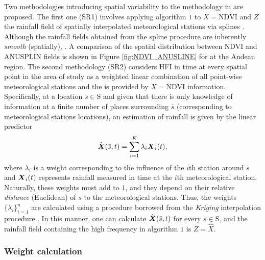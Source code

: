 {{Two methodologies introducing spatial variability to the methodology in  
\citep{Heidinger-et-al_2012,Quiroz-et-al_2011} are proposed. The first 
one (SR1) involves applying algorithm $1$ to $X=\mbox{NDVI}$ and $Z$ the rainfall field of spatially interpolated meteorological stations via splines  \citep{ANUSP_07,Hutchinson_95,Hutchinson_2006}. Although the rainfall fields obtained from the spline procedure are inherently \emph{smooth} (spatially),  . A comparison of the spatial distribution  between NDVI and ANUSPLIN fields is shown in Figure \ref{fig:NDVI_ANUSLINE} for  at the Andean region. The second methodology (SR2) considers HFI in time at every spatial point in the area of study as a weighted linear combination of all point-wise meteorological stations and the  is provided by $X=\mbox{NDVI}$ information. Specifically, at a location $\bar{s}\in \mbox{S}$ and given that there is only knowledge of information at a finite number of places surrounding $\bar{s}$ (corresponding to meteorological stations locations), an estimation of rainfall is given by the linear predictor
\begin{equation} \label{eq:XhatLambda}
\hat{\text{\boldmath $X$}}(\bar{s},t)= \sum_{i=1}^K \lambda_i \text{\boldmath$X$}_{i}(t),
\end{equation}
where $\lambda_i $ is a weight corresponding to the influence of the $i$th station around $\bar{s}$ and $\text{\boldmath $X$}_i(t)$ represents rainfall measured in time at the $i$th meteorological station. Naturally, these weights must add to $1$, and they depend on their relative \emph{distance} (Euclidean) of $\bar{s}$ to the meteorological stations. Thus, the weights $\{\lambda_i\}_{i=1}^{n}$ are calculated using a procedure borrowed from the \emph{Kriging} interpolation procedure \citep{Cressie_91,Goovaerts_97,Matheron_65}. In this manner,  one can calculate $\hat{\text{\boldmath$X$}}(\bar{s},t)$ for every $\bar{s}\in \mbox{S}$, and  the rainfall field containing the high frequency in algorithm $1$ is $Z = \hat{X}$. 
}

\subsubsection{Weight calculation}

}
